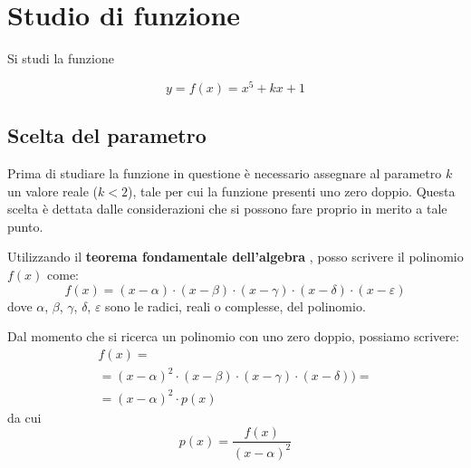 \documentclass[a4paper, oneside, titlepage, reqno]{book}
\begin{document}
\chapter{Studio di funzione}

Si studi la funzione 

\begin{equation}
y=f(x)=x^5+kx+1
\end{equation}

\section{Scelta del parametro}

Prima di studiare la funzione in questione è necessario assegnare al parametro $k$ un valore reale ($k<2$), tale per cui  la funzione presenti uno zero doppio. Questa scelta è dettata dalle considerazioni che si possono fare proprio in merito a tale punto.

Utilizzando il \textbf{teorema fondamentale dell'algebra} \parencite[2]{courant:mate}, posso scrivere il polinomio $f(x)$ come: %
\[
f(x)=(x-\alpha)\cdot(x-\beta)\cdot(x-\gamma)\cdot(x-\delta)\cdot(x-\varepsilon)
\]
dove $\alpha$, $\beta$, $\gamma$, $\delta$, $\varepsilon$ sono le radici, reali o complesse, del polinomio.

Dal momento che si ricerca un polinomio con uno zero doppio, possiamo scrivere:
\begin{multline*}
f(x)=\\
=(x-\alpha)^2\cdot(x-\beta)\cdot(x-\gamma)\cdot(x-\delta))=\\
=(x-\alpha)^2\cdot p(x)
\end{multline*}
da cui
\[
p(x)=\frac{f(x)}{(x-\alpha)^2}
\]
\end{document}
